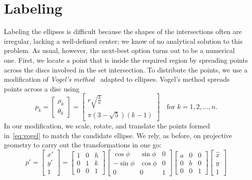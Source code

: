 \documentclass[
  oneside,
  openany,
  numbers=noendperiod,
  parskip=half,
  bibliography=totoc
]{scrbook}\usepackage[]{graphicx}\usepackage{xcolor}
\begin{document}
\section{Labeling}
\label{sec:labeling}

Labeling the ellipses is difficult because the shapes of the intersections
often are irregular, lacking a well-defined center; we know of no analytical
solution to this problem. As usual, however, the next-best option turns out to
be a numerical one. First, we locate a point that is inside the required region
by spreading points across the discs involved in the set intersection. To
distribute the points, we use a modification of
\emph{Vogel's method}~\citep{arthur_2015,vogel_1979} adapted to ellipses.
Vogel's method spreads points across a disc using
\begin{equation}
p_k =
\begin{bmatrix}
  \rho_k \\
  \theta_k
\end{bmatrix} =
\begin{bmatrix}
  r \sqrt{\frac{k}{n}}\\
  \pi (3 - \sqrt{5})(k - 1)
\end{bmatrix}\quad\text{for } k = 1, 2,\dots, n.
\label{eq:vogel}
\end{equation}
In our modification, we scale, rotate, and translate the points formed
in~\eqref{eq:vogel} to match the candidate ellipse. We rely, as before, on
projective geometry to carry out the transformations in one go:
\[
p' =
\begin{bmatrix}
  x' \\
  y' \\
  1
\end{bmatrix} =
\begin{bmatrix}
  1 & 0 & h \\
  0 & 1 & k \\
  0 & 0 & 1
\end{bmatrix}
\begin{bmatrix}
  \cos{\phi}  & \sin{\phi} & 0 \\
  -\sin{\phi} & \cos{\phi} & 0\\
  0           & 0          & 1
\end{bmatrix}
\begin{bmatrix}
  a & 0 & 0 \\
  0 & b & 0 \\
  0 & 0 & 1
\end{bmatrix}
\begin{bmatrix}
  \hat{x} \\
  \hat{y} \\
  1
\end{bmatrix}
\]
\end{document}
